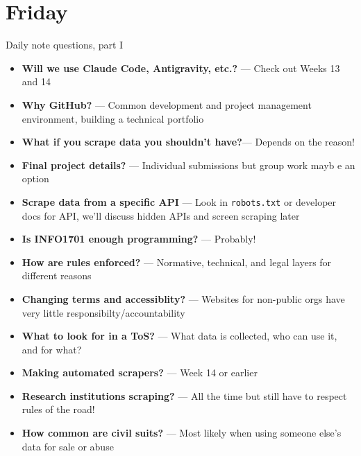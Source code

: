 \documentclass[9pt,aspectratio=169]{beamer}
\begin{document}
\section{Friday}

\begin{frame}{Daily note questions, part I}\small 

    \begin{itemize}
        \item \textbf{Will we use Claude Code, Antigravity, etc.?} --- Check out Weeks 13 and 14
        \item \textbf{Why GitHub?} --- Common development and project management environment, building a technical portfolio
        \item \textbf{What if you scrape data you shouldn't have?}--- Depends on the reason!
        \item \textbf{Final project details?} --- Individual submissions but group work mayb e an option
        \item \textbf{Scrape data from a specific API} --- Look in \texttt{robots.txt} or developer docs for API, we'll discuss hidden APIs and screen scraping later
        \item \textbf{Is INFO1701 enough programming?} --- Probably!
        \item \textbf{How are rules enforced?} --- Normative, technical, and legal layers for different reasons
        \item \textbf{Changing terms and accessiblity?} --- Websites for non-public orgs have very little responsibilty/accountability
        \item \textbf{What to look for in a ToS?} --- What data is collected, who can use it, and for what?
        \item \textbf{Making automated scrapers?} --- Week 14 or earlier
        \item \textbf{Research institutions scraping?} --- All the time but still have to respect rules of the road!
        \item \textbf{How common are civil suits?} --- Most likely when using someone else's data for sale or abuse
    \end{itemize}
    
\end{frame}
\end{document}
